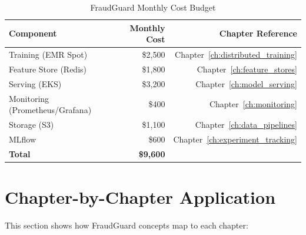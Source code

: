\begin{table}[h]
\centering
\caption{FraudGuard Monthly Cost Budget}
\begin{tabular}{@{}lrr@{}}
\toprule
\textbf{Component} & \textbf{Monthly Cost} & \textbf{Chapter Reference} \\
\midrule
Training (EMR Spot) & \$2,500 & Chapter~\ref{ch:distributed_training} \\
Feature Store (Redis) & \$1,800 & Chapter~\ref{ch:feature_stores} \\
Serving (EKS) & \$3,200 & Chapter~\ref{ch:model_serving} \\
Monitoring (Prometheus/Grafana) & \$400 & Chapter~\ref{ch:monitoring} \\
Storage (S3) & \$1,100 & Chapter~\ref{ch:data_pipelines} \\
MLflow & \$600 & Chapter~\ref{ch:experiment_tracking} \\
\midrule
\textbf{Total} & \textbf{\$9,600} & \\
\bottomrule
\end{tabular}
\end{table}

\section{Chapter-by-Chapter Application}

This section shows how FraudGuard concepts map to each chapter:


